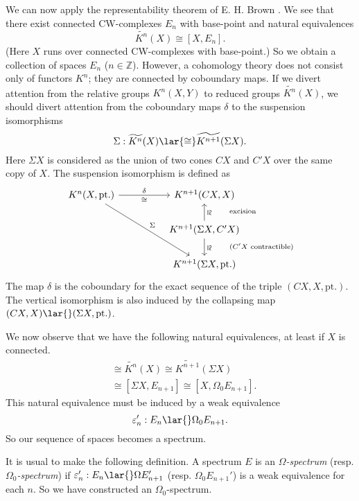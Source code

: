\documentclass[../main]{subfiles}
\begin{document}
We can now apply the representability theorem of E. H. Brown \cite{brown}. We see that there exist connected CW-complexes $E_n$ with base-point and natural equivalences
\[
\widetilde{K^n}(X) \cong [X,E_n].
\]
(Here $X$ runs over connected CW-complexes with base-point.) So we obtain a collection of spaces $E_n$ ($n\in\mathbb Z$). %
However, a cohomology theory does not consist only of functors $K^n$; they are connected by coboundary maps. If we divert attention from the relative groups $K^n(X,Y)$ to reduced groups $\widetilde{K^n}(X)$, we should divert attention from the coboundary maps $\delta$ to the suspension isomorphisms
\[
\Sigma  : \widetilde{K^n}(X) \lar{\cong} \widetilde{K^{n+1}}(\Sigma   X).
\]%
Here $\Sigma   X$ is considered as the union of two cones $CX$ and $C'X$ over the same copy of $X$. The suspension isomorphism is defined as
\[
\begin{tikzcd}
	{K^n(X, \mathrm{pt.})} && {K^{n+1}(CX,X)} \\
	&& {K^{n+1}(\Sigma   X,C'X)} \\
	&& {K^{n+1}(\Sigma   X,\mathrm{pt.})}
	\arrow["\text{\rotatebox{-90}{$\!\!\!\cong$} \qquad excision}"', from=2-3, to=1-3] %
	\arrow["\text{\rotatebox{-90}{$\!\!\!\cong$} \qquad ($C'X$ contractible)}", from=2-3, to=3-3]
	\arrow["\delta", "\cong"', from=1-1, to=1-3]
	\arrow["\Sigma  ", from=1-1, to=3-3]
\end{tikzcd}
\]
The map $\delta$ is the coboundary for the exact sequence of the triple $(CX,X,\mathrm{pt.})$. The vertical isomorphism is also induced by the collapsing map $(CX,X)\lar{} (\Sigma   X,\mathrm{pt.})$.

We now observe that we have the following natural equivalences, at least if $X$ is connected.
    \begin{align*}
    [X,E_n]
    &\cong
    \widetilde{K^n}(X)
        \cong \widetilde{K^{n+1}}(\Sigma   X)
        \\
    &\cong
    [\Sigma   X, E_{n+1}]
        \cong [X, \Omega_0 E_{n+1}]. %
    \end{align*}
This natural equivalence must be induced by a weak equivalence
\[
\varepsilon_n': E_n \lar{} \Omega_0 E_{n+1}.
\]
So our sequence of spaces becomes a spectrum.

It is usual to make the following definition. A spectrum $E$ is an \emph{$\Omega$-spectrum} (resp. \emph{$\Omega_0$-spectrum}) if $\varepsilon_n': E_n \lar{} \Omega E_{n+1}'$ (resp. $\Omega_0 E_{n+1}'$) is a weak equivalence for each $n$. So we have constructed an $\Omega_0$-spectrum.
\end{document}
